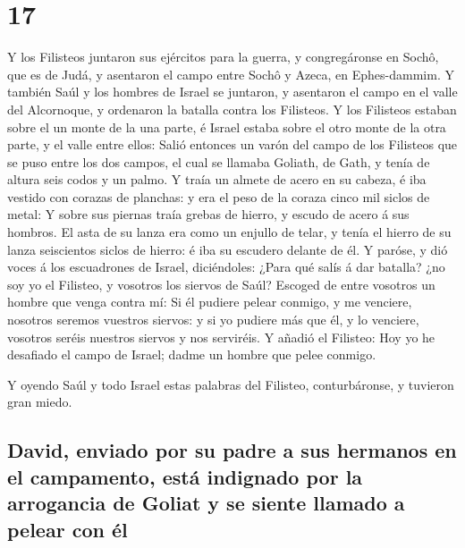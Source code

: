 \hypertarget{section-16}{%
\section{17}\label{section-16}}

 Y los Filisteos juntaron sus ejércitos para la guerra, y
congregáronse en Sochô, que es de Judá, y asentaron el campo entre Sochô
y Azeca, en Ephes-dammim.  Y también Saúl y los hombres de
Israel se juntaron, y asentaron el campo en el valle del Alcornoque, y
ordenaron la batalla contra los Filisteos.  Y los Filisteos
estaban sobre el un monte de la una parte, é Israel estaba sobre el otro
monte de la otra parte, y el valle entre ellos:  Salió
entonces un varón del campo de los Filisteos que se puso entre los dos
campos, el cual se llamaba Goliath, de Gath, y tenía de altura seis
codos y un palmo.  Y traía un almete de acero en su cabeza,
é iba vestido con corazas de planchas: y era el peso de la coraza cinco
mil siclos de metal:  Y sobre sus piernas traía grebas de
hierro, y escudo de acero á sus hombros.  El asta de su
lanza era como un enjullo de telar, y tenía el hierro de su lanza
seiscientos siclos de hierro: é iba su escudero delante de él.
 Y paróse, y dió voces á los escuadrones de Israel,
diciéndoles: ¿Para qué salís á dar batalla? ¿no soy yo el Filisteo, y
vosotros los siervos de Saúl? Escoged de entre vosotros un hombre que
venga contra mí:  Si él pudiere pelear conmigo, y me
venciere, nosotros seremos vuestros siervos: y si yo pudiere más que él,
y lo venciere, vosotros seréis nuestros siervos y nos serviréis.
 Y añadió el Filisteo: Hoy yo he desafiado el campo de
Israel; dadme un hombre que pelee conmigo.

 Y oyendo Saúl y todo Israel estas palabras del Filisteo,
conturbáronse, y tuvieron gran miedo.

\hypertarget{david-enviado-por-su-padre-a-sus-hermanos-en-el-campamento-estuxe1-indignado-por-la-arrogancia-de-goliat-y-se-siente-llamado-a-pelear-con-uxe9l}{%
\subsection{David, enviado por su padre a sus hermanos en el campamento,
está indignado por la arrogancia de Goliat y se siente llamado a pelear
con
él}\label{david-enviado-por-su-padre-a-sus-hermanos-en-el-campamento-estuxe1-indignado-por-la-arrogancia-de-goliat-y-se-siente-llamado-a-pelear-con-uxe9l}}

